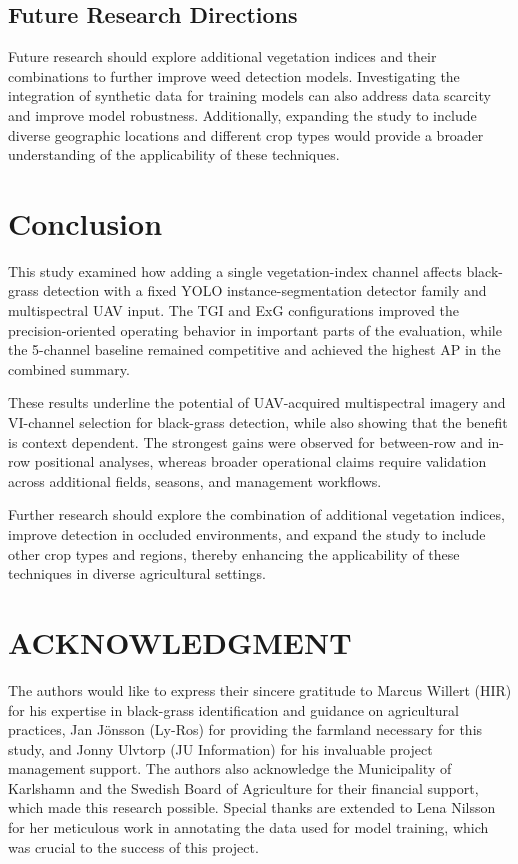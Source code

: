 \documentclass{ieeeaccess}
\begin{document}
\subsection{Future Research Directions}
Future research should explore additional vegetation indices and their combinations to further improve weed detection models. Investigating the integration of synthetic data for training models can also address data scarcity and improve model robustness. Additionally, expanding the study to include diverse geographic locations and different crop types would provide a broader understanding of the applicability of these techniques.

\section{Conclusion}

This study examined how adding a single vegetation-index channel affects black-grass detection with a fixed YOLO instance-segmentation detector family and multispectral UAV input. The TGI and ExG configurations improved the precision-oriented operating behavior in important parts of the evaluation, while the 5-channel baseline remained competitive and achieved the highest AP in the combined summary.

These results underline the potential of UAV-acquired multispectral imagery and VI-channel selection for black-grass detection, while also showing that the benefit is context dependent. The strongest gains were observed for between-row and in-row positional analyses, whereas broader operational claims require validation across additional fields, seasons, and management workflows.

Further research should explore the combination of additional vegetation indices, improve detection in occluded environments, and expand the study to include other crop types and regions, thereby enhancing the applicability of these techniques in diverse agricultural settings.


\section{ACKNOWLEDGMENT}
The authors would like to express their sincere gratitude to Marcus Willert (HIR) for his expertise in black-grass identification and guidance on agricultural practices, Jan Jönsson (Ly-Ros) for providing the farmland necessary for this study, and Jonny Ulvtorp (JU Information) for his invaluable project management support. The authors also acknowledge the Municipality of Karlshamn and the Swedish Board of Agriculture for their financial support, which made this research possible. Special thanks are extended to Lena Nilsson for her meticulous work in annotating the data used for model training, which was crucial to the success of this project.
\end{document}
